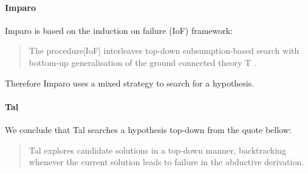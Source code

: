 \paragraph{Imparo}
Imparo is based on the induction on failure (IoF) framework:
\begin{quote}\cite{kimber2012learning}
The procedure[IoF] interleaves top-down subsumption-based search with bottom-up generalisation of the ground connected theory T .
\end{quote}
Therefore Imparo uses a mixed strategy to search for a hypothesis.
\paragraph{Tal}
We conclude that Tal searches a hypothesis top-down from the quote bellow:
\begin{quote}\cite{corapi2010inductive}
Tal explores candidate solutions in a top-down manner,
backtracking whenever the current solution leads to failure in the abductive derivation.
\end{quote}
